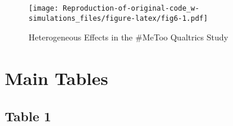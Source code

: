 \documentclass[
]{article}
\newenvironment{Shaded}{\begin{snugshade}}{\end{snugshade}}
\newcommand{\FunctionTok}[1]{\textcolor[rgb]{0.00,0.00,0.00}{#1}}
\newcommand{\NormalTok}[1]{#1}
\newcommand{\SpecialCharTok}[1]{\textcolor[rgb]{0.00,0.00,0.00}{#1}}
\newcommand{\StringTok}[1]{\textcolor[rgb]{0.31,0.60,0.02}{#1}}
\begin{document}
\begin{figure}
\centering
\texttt{[image: Reproduction-of-original-code\_w-simulations\_files/figure-latex/fig6-1.pdf]}
\caption{Heterogeneous Effects in the \#MeToo Qualtrics Study}
\end{figure}

\hypertarget{main-tables}{%
\section{Main Tables}\label{main-tables}}

\hypertarget{table-1}{%
\subsection{Table 1}\label{table-1}}

\begin{Shaded}
\end{Shaded}
\end{document}
